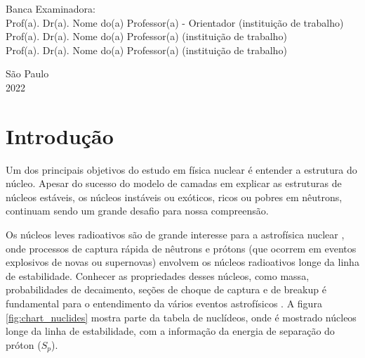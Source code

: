 \documentclass[a4paper,12pt,oneside]{book}
\begin{document}
\par
\leftskip 6cm
\par
\leftskip 0cm
\vskip 2cm


\noindent Banca Examinadora: \\
\noindent Prof(a). Dr(a). Nome do(a) Professor(a) - Orientador (institui\c{c}\~{a}o de trabalho) \\
Prof(a). Dr(a). Nome do(a) Professor(a) (institui\c{c}\~{a}o de trabalho) \\
Prof(a). Dr(a). Nome do(a) Professor(a) (institui\c{c}\~{a}o de trabalho) \\
\vspace{1.8cm}


\begin{center}
    {S\~ao Paulo \\  2022}
\end{center}%
    
\clearpage

\tableofcontents
\newpage

\chapter{Introdução}


\par Um dos principais objetivos do estudo em física nuclear é entender a estrutura do núcleo. Apesar do sucesso do modelo de camadas em explicar as estruturas de núcleos estáveis, os núcleos instáveis ou exóticos, ricos ou pobres em nêutrons, continuam sendo um grande desafio para nossa compreensão.

\par Os núcleos leves radioativos são de grande interesse para a astrofísica nuclear \cite{BARDAYAN2017415}, onde processos de captura rápida de nêutrons e prótons (que ocorrem em eventos explosivos de novas ou supernovas) envolvem os núcleos radioativos longe da linha de estabilidade. Conhecer as propriedades desses núcleos, como massa, probabilidades de decaimento, seções de choque de captura e de breakup é fundamental para o entendimento da vários eventos astrofísicos \cite{BARDAYAN2017415, abud_mater}. A figura \ref{fig:chart_nuclides} mostra parte da tabela de nuclídeos, onde é mostrado núcleos longe da linha de estabilidade, com a informação da energia de separação do próton ($S_p$).
\end{document}
